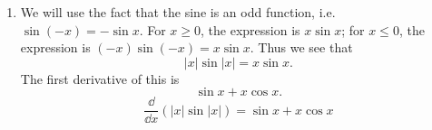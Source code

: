 \begin{Solution}
\begin{enumerate}
\begin{align*}
        \exp( x \ln x ) \frac{1}{x} \right) \\
      &= x^{x^x} \left(
        x^x (\ln x + x \frac{1}{x}) \ln x  +
        x^{-1} \exp( x \ln x ) \right) \\
      &= x^{x^x} \left(
        x^x (\ln x + 1) \ln x  + x^{-1} x^x \right) \\
      &= x^{x^x + x} \left( x^{-1} + \ln x + \ln^2 x \right)
    \end{align*}
    \[
    \boxed{
      \frac{\dd}{\dd x} x^{x^x}
      = x^{x^x + x} \left( x^{-1} + \ln x + \ln^2 x \right)
      }
    \]
  \item
    We will use the fact that the sine is an odd function, i.e. 
    $\sin(-x) = - \sin x$.
    For $x \geq 0$, the expression is $x \sin x$;  for $x \leq 0$, the expression
    is $(-x) \sin(-x) = x \sin x$.  Thus we see that
    \[
    |x| \sin |x| = x \sin x.
    \]
    The first derivative of this is
    \[
    \sin x + x \cos x.
    \]
    \[
    \boxed{
      \frac{\dd}{\dd x} (|x| \sin |x| ) = \sin x + x \cos x
      }
    \]
  \end{enumerate}
  \renewcommand{\theenumi}{\arabic{enumi}}
\end{Solution}






